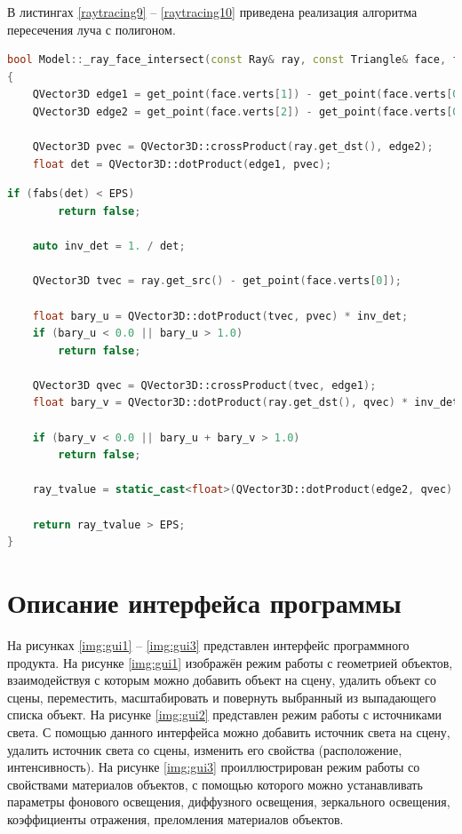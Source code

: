 В листингах \ref{raytracing9} -- \ref{raytracing10}   приведена реализация алгоритма пересечения луча с полигоном.
\begin{lstlisting}[label=raytracing9,caption=Реализация алгоритма пересечения луча с полигоном (начало), language=C++]
bool Model::_ray_face_intersect(const Ray& ray, const Triangle& face, float& ray_tvalue) const
{
	QVector3D edge1 = get_point(face.verts[1]) - get_point(face.verts[0]);
	QVector3D edge2 = get_point(face.verts[2]) - get_point(face.verts[0]);
	
	QVector3D pvec = QVector3D::crossProduct(ray.get_dst(), edge2);
	float det = QVector3D::dotProduct(edge1, pvec);
\end{lstlisting}
\clearpage
\begin{lstlisting}[label=raytracing10,caption=Реализация алгоритма пересечения луча с полигоном (окончание), language=C++]
	if (fabs(det) < EPS)
		return false;
	
	auto inv_det = 1. / det;
	
	QVector3D tvec = ray.get_src() - get_point(face.verts[0]);
	
	float bary_u = QVector3D::dotProduct(tvec, pvec) * inv_det;
	if (bary_u < 0.0 || bary_u > 1.0)
		return false;
	
	QVector3D qvec = QVector3D::crossProduct(tvec, edge1);
	float bary_v = QVector3D::dotProduct(ray.get_dst(), qvec) * inv_det;
	
	if (bary_v < 0.0 || bary_u + bary_v > 1.0)
		return false;
	
	ray_tvalue = static_cast<float>(QVector3D::dotProduct(edge2, qvec) * inv_det);
	
	return ray_tvalue > EPS;
}
\end{lstlisting}

\section{Описание интерфейса программы}

На рисунках \ref{img:gui1} -- \ref{img:gui3} представлен интерфейс программного продукта. На рисунке \ref{img:gui1} изображён режим работы с геометрией объектов, взаимодействуя с которым можно добавить объект на сцену, удалить объект со сцены, переместить, масштабировать и повернуть выбранный из выпадающего списка объект.  На рисунке \ref{img:gui2} представлен режим работы с источниками света. С помощью данного интерфейса можно добавить источник света на сцену, удалить источник света со сцены, изменить его свойства (расположение, интенсивность). На рисунке \ref{img:gui3} проиллюстрирован режим работы со свойствами материалов объектов, с помощью которого можно устанавливать параметры фонового освещения, диффузного освещения, зеркального освещения, коэффициенты отражения, преломления материалов объектов.

